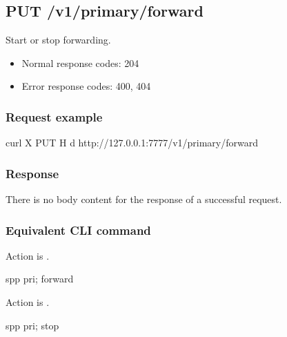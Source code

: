 \documentclass[a4paper,11pt,openany,oneside,english]{sphinxmanual}
\begin{document}
\subsection{PUT /v1/primary/forward}
\label{\detokenize{api_ref/spp_primary:put-v1-primary-forward}}
Start or stop forwarding.
\begin{itemize}
\item {} 
Normal response codes: 204

\item {} 
Error response codes: 400, 404

\end{itemize}


\subsubsection{Request example}
\label{\detokenize{api_ref/spp_primary:id1}}
\begin{sphinxVerbatim}[commandchars=\\\{\},formatcom=\footnotesize]
 curl \PYGZhy{}X PUT \PYGZhy{}H  \PYGZhy{}d  
  http://127.0.0.1:7777/v1/primary/forward
\end{sphinxVerbatim}


\subsubsection{Response}
\label{\detokenize{api_ref/spp_primary:id2}}
There is no body content for the response of a successful  request.


\subsubsection{Equivalent CLI command}
\label{\detokenize{api_ref/spp_primary:equivalent-cli-command}}
Action is .

\begin{sphinxVerbatim}[commandchars=\\\{\},formatcom=\footnotesize]
spp \PYGZgt{} pri; forward
\end{sphinxVerbatim}

Action is .

\begin{sphinxVerbatim}[commandchars=\\\{\},formatcom=\footnotesize]
spp \PYGZgt{} pri; stop
\end{sphinxVerbatim}
\end{document}
